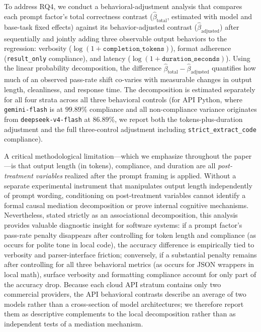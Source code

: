 \documentclass[a4paper,fleqn]{cas-sc}
\begin{document}
To address RQ4, we conduct a behavioral-adjustment analysis that compares each prompt factor's total correctness contrast ($\hat{\beta}_{\text{total}}$, estimated with model and base-task fixed effects) against its behavior-adjusted contrast ($\hat{\beta}_{\text{adjusted}}$) after sequentially and jointly adding three observable output behaviors to the regression: verbosity ($\log(1 + \texttt{completion\_tokens})$), format adherence (\texttt{result\_only} compliance), and latency ($\log(1 + \texttt{duration\_seconds})$). Using the linear probability decomposition, the difference $\hat{\beta}_{\text{total}} - \hat{\beta}_{\text{adjusted}}$ quantifies how much of an observed pass-rate shift co-varies with measurable changes in output length, cleanliness, and response time. The decomposition is estimated separately for all four strata across all three behavioral controls (for API Python, where \texttt{gemini-flash} is at $99.89\%$ compliance and all non-compliance variance originates from \texttt{deepseek-v4-flash} at $86.89\%$, we report both the tokens-plus-duration adjustment and the full three-control adjustment including \texttt{strict\_extract\_code} compliance).

A critical methodological limitation—which we emphasize throughout the paper—is that output length (in tokens), compliance, and duration are all \emph{post-treatment variables} realized after the prompt framing is applied. Without a separate experimental instrument that manipulates output length independently of prompt wording, conditioning on post-treatment variables cannot identify a formal causal mediation decomposition or prove internal cognitive mechanisms. Nevertheless, stated strictly as an associational decomposition, this analysis provides valuable diagnostic insight for software systems: if a prompt factor's pass-rate penalty disappears after controlling for token length and compliance (as occurs for polite tone in local code), the accuracy difference is empirically tied to verbosity and parser-interface friction; conversely, if a substantial penalty remains after controlling for all three behavioral metrics (as occurs for JSON wrappers in local math), surface verbosity and formatting compliance account for only part of the accuracy drop. Because each cloud API stratum contains only two commercial providers, the API behavioral contrasts describe an average of two models rather than a cross-section of model architectures; we therefore report them as descriptive complements to the local decomposition rather than as independent tests of a mediation mechanism.
\end{document}
